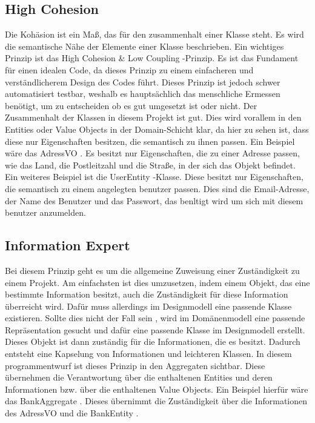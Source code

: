 \subsection{High Cohesion}
Die Kohäsion ist ein Maß, das für den zusammenhalt einer Klasse steht. Es wird die semantische Nähe der Elemente einer Klasse beschrieben. 
\newline Ein wichtiges Prinzip ist das \glqq High Cohesion \& Low Coupling \grqq -Prinzip. Es ist das Fundament für einen idealen Code, da dieses Prinzip zu einem einfacheren und verständlicherem Design des Codes führt. 
Dieses Prinzip ist jedoch schwer automatisiert testbar, weshalb es hauptsächlich das menschliche Ermessen benötigt, um zu entscheiden ob es gut umgesetzt ist oder nicht.
\newline Der Zusammenhalt der Klassen in diesem Projekt ist gut. Dies wird vorallem in den Entities oder Value Objects in der Domain-Schicht klar, da hier zu sehen ist, dass diese nur Eigenschaften besitzen, die semantisch zu ihnen passen.
Ein Beispiel wäre das \glqq AdressVO \grqq . Es besitzt nur Eigenschaften, die zu einer Adresse passen, wie das Land, die Postleitzahl und die Straße, in der sich das Objekt befindet. 
Ein weiteres Beispiel ist die \glqq UserEntity \grqq -Klasse. Diese besitzt nur Eigenschaften, die semantisch zu einem angelegten benutzer passen. Dies sind die Email-Adresse, der Name des Benutzer und das Passwort, das benltigt wird um sich mit diesem benutzer anzumelden.
\subsection{Information Expert}
Bei diesem Prinzip geht es um die allgemeine Zuweisung einer Zuständigkeit zu einem Projekt. Am einfachsten ist dies umzusetzen, indem einem Objekt, das eine bestimmte Information besitzt, auch die Zuständigkeit für diese Information überreicht wird. 
Dafür muss allerdings im Designmodell eine passende Klasse existieren. Sollte dies nicht der Fall sein , wird im Domänenmodell eine passende Repräsentation gesucht und dafür eine passende Klasse im Designmodell erstellt. Dieses Objekt ist dann zuständig für die Informationen, die es besitzt. Dadurch entsteht eine Kapselung 
von Informationen und leichteren Klassen.
\newline In diesem programmentwurf ist dieses Prinzip in den Aggregaten sichtbar. Diese übernehmen die Verantwortung über die enthaltenen Entities und deren Informationen bzw. über die 
enthaltenen Value Objects. Ein Beispiel hierfür wäre das \glqq BankAggregate \grqq . Dieses übernimmt die Zuständigkeit über die Informationen des \glqq AdressVO \grqq und die \glqq BankEntity \grqq .
